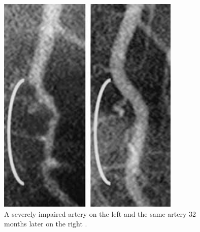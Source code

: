 \begin{figure}[htpb]
    \centering
    \includegraphics[width=0.8\linewidth]{media/Screenshot_2020-01-07_JFP_06307_Article1 pdf.png}
    \caption{A severely impaired artery on the left and the same artery 32 months later on the right \cite{esselstyn2014way}.}%
    \label{fig:reverseCAD}
\end{figure}
